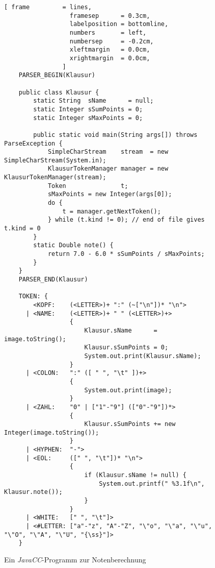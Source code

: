 \begin{figure}[!h]
\centering
\begin{Verbatim}[ frame         = lines, 
                  framesep      = 0.3cm, 
                  labelposition = bottomline,
                  numbers       = left,
                  numbersep     = -0.2cm,
                  xleftmargin   = 0.0cm,
                  xrightmargin  = 0.0cm,
                ]
    PARSER_BEGIN(Klausur)
    
    public class Klausur {
        static String  sName      = null;
        static Integer sSumPoints = 0;
        static Integer sMaxPoints = 0;
        
        public static void main(String args[]) throws ParseException {
            SimpleCharStream    stream  = new SimpleCharStream(System.in);
            KlausurTokenManager manager = new KlausurTokenManager(stream);
            Token               t;
            sMaxPoints = new Integer(args[0]);
            do {
                t = manager.getNextToken();
            } while (t.kind != 0); // end of file gives t.kind = 0 
        }
        static Double note() {
            return 7.0 - 6.0 * sSumPoints / sMaxPoints;
        }
    }
    PARSER_END(Klausur)
    
    TOKEN: {
        <KOPF:    (<LETTER>)+ ":" (~["\n"])* "\n">
      | <NAME:    (<LETTER>)+ " " (<LETTER>)+>  
                  {
                      Klausur.sName      = image.toString(); 
                      Klausur.sSumPoints = 0;
                      System.out.print(Klausur.sName);
                  }
      | <COLON:   ":" ([ " ", "\t" ])+>         
                  { 
                      System.out.print(image); 
                  }
      | <ZAHL:    "0" | ["1"-"9"] (["0"-"9"])*> 
                  { 
                      Klausur.sSumPoints += new Integer(image.toString()); 
                  }
      | <HYPHEN:  "-">
      | <EOL:     ([" ", "\t"])* "\n">          
                  { 
                      if (Klausur.sName != null) {
                          System.out.printf(" %3.1f\n", Klausur.note()); 
                      }
                  }
      | <WHITE:   [" ", "\t"]>
      | <#LETTER: ["a"-"z", "A"-"Z", "\"o", "\"a", "\"u", "\"O", "\"A", "\"U", "{\ss}"]>
    }
\end{Verbatim}
\vspace*{-0.3cm}
\caption{Ein \textsl{JavaCC}-Programm zur Notenberechnung}
\label{fig:Klausur.jj}
\end{figure}

